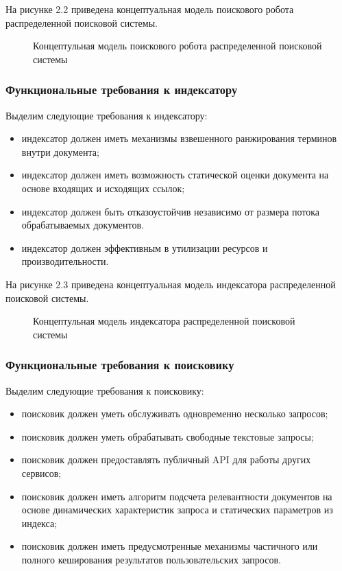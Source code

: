 На рисунке 2.2 приведена концептуальная модель поискового робота распределенной поисковой системы.

\begin{figure}[H]
\caption{Концептульная модель поискового робота распределенной поисковой системы}
\label{concept_robot_model:image}
\end{figure}

\subsubsection{Функциональные требования к индексатору}
Выделим следующие требования к индексатору:
\begin{itemize}
\item индексатор должен иметь механизмы взвешенного ранжирования терминов внутри документа;
\item индексатор должен иметь возможность статической оценки документа на основе входящих и исходящих ссылок;
\item индексатор должен быть отказоустойчив независимо от размера потока обрабатываемых документов.
\item индексатор должен эффективным в утилизации ресурсов и производительности.
\end{itemize}

На рисунке 2.3 приведена концептуальная модель индексатора распределенной поисковой системы.

\begin{figure}[H]
\caption{Концептульная модель индексатора распределенной поисковой системы}
\label{concept_indexer_model:image}
\end{figure}

\subsubsection{Функциональные требования к поисковику}
Выделим следующие требования к поисковику:
\begin{itemize}
\item поисковик должен уметь обслуживать одновременно несколько запросов;
\item поисковик должен уметь обрабатывать свободные текстовые запросы;
\item поисковик должен предоставлять публичный API для работы других сервисов;
\item поисковик должен иметь алгоритм подсчета релевантности документов на основе динамических характеристик запроса и статических параметров из индекса;
\item поисковик должен иметь предусмотренные механизмы частичного или полного кеширования результатов пользовательских запросов.
\end{itemize}

